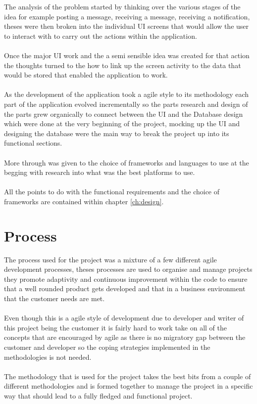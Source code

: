 The analysis of the problem started by thinking over the various stages of the idea for example posting a message, receiving a message, receiving a notification, theses were then broken into the individual UI screens that would allow the user to interact with to carry out the actions within the application.\\
\\
Once the major UI work and the a semi sensible idea was created for that action the thoughts turned to the how to link up the screen activity to the data that would be stored that enabled the application to work.\\
\\
As the development of the application took a agile style to its methodology each part of the application evolved incrementally so the parts research and design of the parts grew organically to connect between the UI and the Database design which were done at the very beginning of the project, mocking up the UI and designing the database were the main way to break the project up into its functional sections.\\
\\
More through was given to the choice of frameworks and languages to use at the begging with research into what was the best platforms to use.\\
\\
All the points to do with the functional requirements and the choice of frameworks are contained within chapter \ref{ch:design}.

\section{Process}

The process used for the project was a mixture of a few different agile development processes, theses processes are used to organise and manage projects they promote adaptivity and continuous improvement within the code to ensure that a well rounded product gets developed and that in a business environment that the customer needs are met.\\
\\
Even though this is a agile style of development due to developer and writer of this project being the customer it is fairly hard to work take on all of the concepts that are encouraged by agile as there is no migratory gap between the customer and developer so the coping strategies implemented in the methodologies is not needed.\\
\\
The methodology that is used for the project takes the best bits from a couple of different methodologies and is formed together to manage the project in a specific way that should lead to a fully fledged and functional project.

